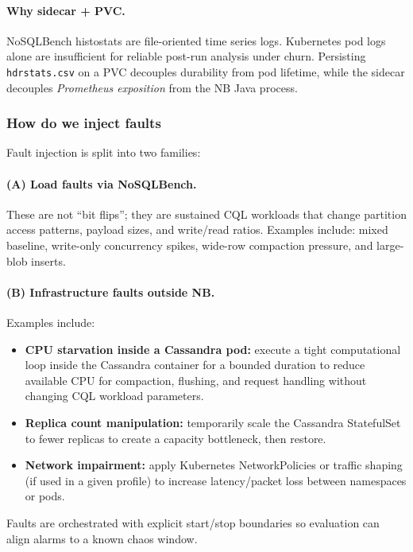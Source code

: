 \documentclass[11pt,a4paper]{article}
\begin{document}
\paragraph{Why sidecar + PVC.}
NoSQLBench histostats are file-oriented time series logs. Kubernetes pod logs alone are insufficient for reliable post-run analysis under churn. Persisting \texttt{hdrstats.csv} on a PVC decouples durability from pod lifetime, while the sidecar decouples \emph{Prometheus exposition} from the NB Java process.

\subsubsection{How do we inject faults}
\label{subsubsec:faults}

Fault injection is split into two families:

\paragraph{(A) Load faults via NoSQLBench.}
These are not ``bit flips''; they are sustained CQL workloads that change partition access patterns, payload sizes, and write/read ratios. Examples include: mixed baseline, write-only concurrency spikes, wide-row compaction pressure, and large-blob inserts.

\paragraph{(B) Infrastructure faults outside NB.}
Examples include:
\begin{itemize}[leftmargin=*]
  \item \textbf{CPU starvation inside a Cassandra pod:} execute a tight computational loop inside the Cassandra container for a bounded duration to reduce available CPU for compaction, flushing, and request handling without changing CQL workload parameters.
  \item \textbf{Replica count manipulation:} temporarily scale the Cassandra StatefulSet to fewer replicas to create a capacity bottleneck, then restore.
  \item \textbf{Network impairment:} apply Kubernetes NetworkPolicies or traffic shaping (if used in a given profile) to increase latency/packet loss between namespaces or pods.
\end{itemize}

Faults are orchestrated with explicit start/stop boundaries so evaluation can align alarms to a known chaos window.
\end{document}
